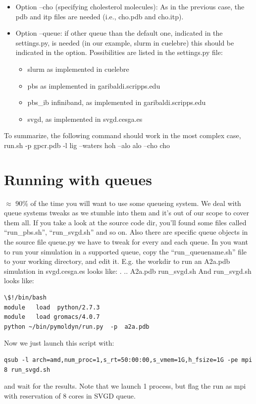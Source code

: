 \documentclass[10pt, oneside, pdftex]{article}
\begin{document}
\begin{itemize}
\begin{itemize}
{  structural waters: ion-local.pdb  and ion-local.itp.}  
\item{Option --cho
  (specifying cholesterol molecules): As in the previous case, the pdb
  and  itp files  are needed  (i.e., cho.pdb  and cho.itp).}
\item{Option --queue:  if other  queue than  the  default one,  indicated in  the
  settings.py,  is needed  (in our  example, slurm  in  cuelebre) this
  should be indicated  in the option. Possibilities are  listed in the
  settings.py  file:}
\begin{itemize}
\item{slurm  as  implemented in  cuelebre}
\item{pbs  as  implemented  in   garibaldi.scripps.edu}
\item{pbs\_ib   infiniband,  as implemented  in  garibaldi.scripps.edu}
\item{svgd, as  implemented  in svgd.cesga.es}
\end{itemize}
\end{itemize}
\end{itemize}

To summarize, the following command should work in the most complex case,
run.sh -p gpcr.pdb -l lig --waters hoh --alo alo --cho cho

\section*{Running with queues}
$\approx$ 90\% of the time you will  want to use some queueing system. We
deal with queue systems tweaks as we stumble into them and it's out of
our scope to  cover them all.  If  you take a look at  the source code
dir, you'll found some  files called ``run\_pbs.sh'', ``run\_svgd.sh''
and so  on. Also there are  specific queue objects in  the source file
queue.py we have  to tweak for every  and each queue.  In  you want to
run    your   simulation    in   a    supported   queue,    copy   the
``run\_queuename.sh''  file  to  your   working  directory,  and  edit
it. E.g.   the workdir to  run an A2a.pdb simulation  in svgd.cesga.es
looks like: . .. A2a.pdb run\_svgd.sh And run\_svgd.sh looks like:
\begin{Verbatim}
\$!/bin/bash   
module   load  python/2.7.3
module   load gromacs/4.0.7
python ~/bin/pymoldyn/run.py  -p  a2a.pdb 
\end{Verbatim}

Now  we  just launch this script with: 
\begin{Verbatim}
qsub -l arch=amd,num_proc=1,s_rt=50:00:00,s_vmem=1G,h_fsize=1G -pe mpi 8 run_svgd.sh 
\end{Verbatim}
and wait  for the results. Note that  we launch 1 process,
but flag the run as mpi with reservation of 8 cores in SVGD queue.
\end{document}
